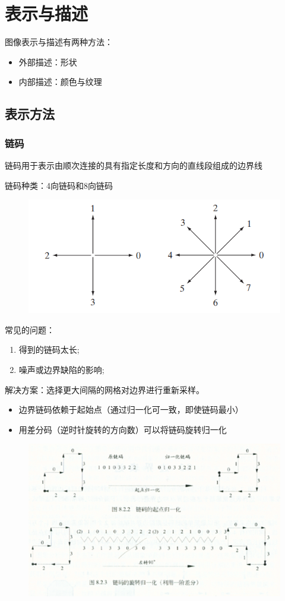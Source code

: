 
\section{表示与描述} %
图像表示与描述有两种方法：
\begin{itemize}
	\item 外部描述：形状
	\item 内部描述：颜色与纹理
\end{itemize}

\subsection{表示方法}
\subsubsection{链码}
链码用于表示由顺次连接的具有指定长度和方向的直线段组成的边界线

链码种类：4向链码和8向链码
\begin{figure}[H]
\centering
\includegraphics[width=0.4\linewidth]{fig/chain_code.png}
\end{figure}

常见的问题：
\begin{enumerate}
\item 得到的链码太长;
\item 噪声或边界缺陷的影响;
\end{enumerate}

解决方案：选择更大间隔的网格对边界进行重新采样。
\begin{itemize}
\item 边界链码依赖于起始点（通过归一化可一致，即使链码最小）
\item 用差分码（逆时针旋转的方向数）可以将链码旋转归一化
\end{itemize}
\begin{figure}[H]
\centering
\includegraphics[width=0.8\linewidth]{fig/chain_code_difference.png}
\end{figure}

